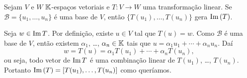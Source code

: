 \begin{lema}\label{transformacao_gera_imagem}
    Sejam $V$ e $W$ $\mathbb{K}$-espaços vetoriais e $T \colon V \to W$ uma transformação linear. Se $\mathcal{B} = \{u_1, \dots, u_n\}$ é uma base de $V$, então $\{T(u_1), \dots, T(u_n)\}$ gera ${\rm Im\,}(T)$.
\end{lema}
\begin{prova}
    Seja $w \in {\rm Im\,} T$. Por definição, existe $u \in V$ tal que $T(u) = w$. Como $\mathcal{B}$ é uma base de $V$, então existem $\alpha_1$, \dots, $\alpha_n \in \mathbb{K}$ tais que $u = \alpha_1u_1 + \cdots + \alpha_nu_n$. Daí
    \[
        w = T(u) = \alpha_1T(u_1) + \cdots + \alpha_nT(u_n),
    \]
    ou seja, todo vetor de ${\rm Im\,} T$ é uma combinação linear de $T(u_1)$, \dots, $T(u_n)$. Portanto ${\rm Im\,}(T) = [T(u_1), \dots, T(u_n)]$ como queríamos.
\end{prova}

